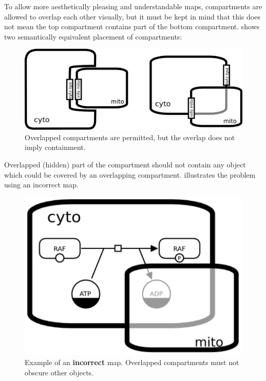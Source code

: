 To allow more aesthetically pleasing and understandable maps, compartments are allowed to overlap each other visually, but it must be kept in mind that this does not mean the top compartment contains part of the bottom compartment.   shows two semantically equivalent placement of compartments:

\begin{figure}[H]
  \centering
  \includegraphics[scale = 0.4]{examples/compartment_overlapping}
  \caption{Overlapped compartments are permitted, but the overlap does not imply containment.}
  \label{fig:overlap}
\end{figure}

Overlapped (hidden) part of the compartment should not contain any object which could be covered by an overlapping compartment.   illustrates the problem using an incorrect map.

\begin{figure}[H]
  \centering
  \includegraphics[scale = 0.45]{examples/compartment_overlapping_wrong}
  \caption{Example of an \textbf{incorrect} map.  Overlapped compartments must not obscure other objects.}
  \label{fig:overlap-bad}
\end{figure}

